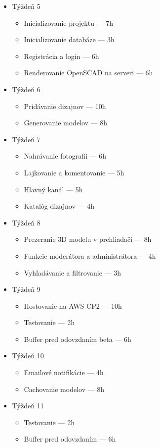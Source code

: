 \documentclass[a4paper]{article}
\begin{document}
\begin{itemize}
    \item Týždeň 5
    \begin{itemize}
        \item Inicializovanie projektu --- 7h
        \item Inicializovanie databáze --- 3h
        \item Registrácia a login --- 6h
        \item Renderovanie OpenSCAD na serveri --- 6h
    \end{itemize}
    \item Týždeň 6
    \begin{itemize}
        \item Pridávanie dizajnov --- 10h
        \item Generovanie modelov --- 8h
    \end{itemize}
    \item Týždeň 7
    \begin{itemize}
        \item Nahrávanie fotografii --- 6h
        \item Lajkovanie a komentovanie --- 5h
        \item Hlavný kanál --- 5h
        \item Katalóg dizajnov --- 4h
    \end{itemize}
    \item Týždeň 8
    \begin{itemize}
        \item Prezeranie 3D modelu v prehliadači --- 8h
        \item Funkcie moderátora a administrátora --- 4h
        \item Vyhľadávanie a filtrovanie --- 3h
    \end{itemize}
    \item Týždeň 9
    \begin{itemize}
        \item Hostovanie na AWS CP2 --- 10h
        \item Testovanie --- 2h
        \item Buffer pred odovzdaním beta --- 6h
    \end{itemize}
    \item Týždeň 10
    \begin{itemize}
        \item Emailové notifikácie --- 4h
        \item Cachovanie modelov --- 8h
    \end{itemize}
    \item Týždeň 11
    \begin{itemize}
        \item Testovanie --- 2h
        \item Buffer pred odovzdaním --- 6h
    \end{itemize}

\end{itemize}
\end{document}
